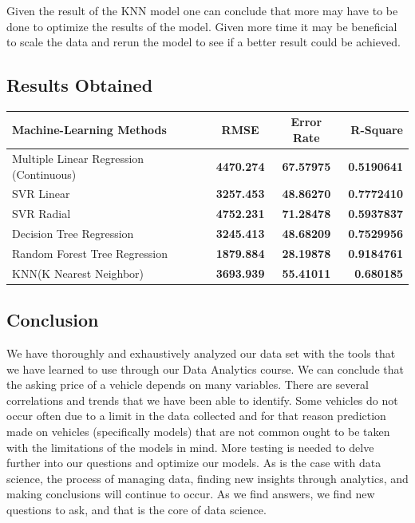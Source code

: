 \documentclass[
]{article}
\begin{document}
Given the result of the KNN model one can conclude that more may have to
be done to optimize the results of the model. Given more time it may be
beneficial to scale the data and rerun the model to see if a better
result could be achieved.

\hypertarget{results-obtained}{%
\subsection{Results Obtained}\label{results-obtained}}

\begin{longtable}[]{@{}lccr@{}}
\toprule
Machine-Learning Methods & RMSE & Error Rate & R-Square\tabularnewline
\midrule
\endhead
Multiple Linear Regression (Continuous) & \textbf{4470.274} &
\textbf{67.57975} & \textbf{0.5190641}\tabularnewline
SVR Linear & \textbf{3257.453} & \textbf{48.86270} &
\textbf{0.7772410}\tabularnewline
SVR Radial & \textbf{4752.231} & \textbf{71.28478} &
\textbf{0.5937837}\tabularnewline
Decision Tree Regression & \textbf{3245.413} & \textbf{48.68209} &
\textbf{0.7529956}\tabularnewline
Random Forest Tree Regression & \textbf{1879.884} & \textbf{28.19878} &
\textbf{0.9184761}\tabularnewline
KNN(K Nearest Neighbor) & \textbf{3693.939} & \textbf{55.41011} &
\textbf{0.680185}\tabularnewline
\bottomrule
\end{longtable}

\hypertarget{conclusion}{%
\subsection{Conclusion}\label{conclusion}}

We have thoroughly and exhaustively analyzed our data set with the tools
that we have learned to use through our Data Analytics course. We can
conclude that the asking price of a vehicle depends on many variables.
There are several correlations and trends that we have been able to
identify. Some vehicles do not occur often due to a limit in the data
collected and for that reason prediction made on vehicles (specifically
models) that are not common ought to be taken with the limitations of
the models in mind. More testing is needed to delve further into our
questions and optimize our models. As is the case with data science, the
process of managing data, finding new insights through analytics, and
making conclusions will continue to occur. As we find answers, we find
new questions to ask, and that is the core of data science.
\end{document}
